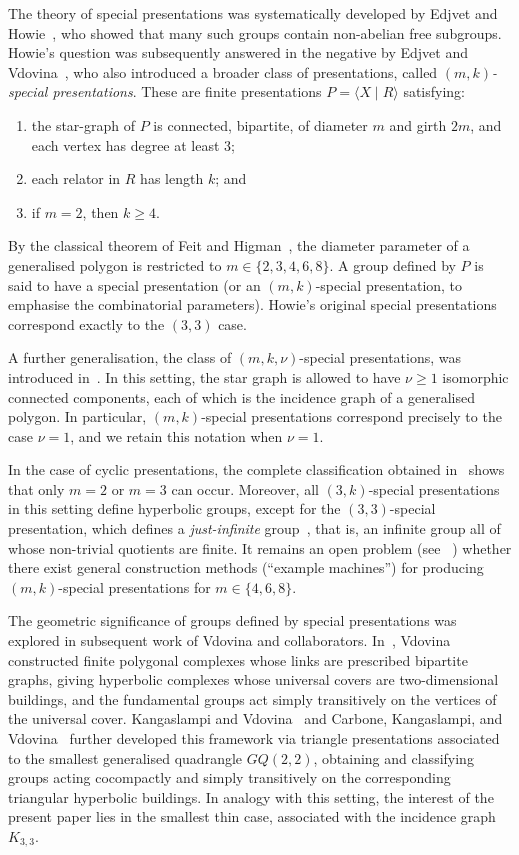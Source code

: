\documentclass[a4paper,12pt,oneside]{article}
\begin{document}
\medskip
The theory of special presentations was systematically developed by Edjvet and Howie~\cite{EH88}, who showed that many such groups contain non-abelian free subgroups. Howie’s question was subsequently answered in the negative by Edjvet and Vdovina~\cite{EV10}, who also introduced a broader class of presentations, called \emph{$(m,k)$-special presentations}. These are finite presentations $P=\langle X \mid R\rangle$ satisfying:
\begin{enumerate}
\item the star-graph of $P$ is connected, bipartite, of diameter $m$ and girth $2m$, and each vertex has degree at least $3$;
\item each relator in $R$ has length $k$; and
\item if $m=2$, then $k \ge 4$.
\end{enumerate}
By the classical theorem of Feit and Higman~\cite{FH64}, the diameter parameter of a generalised polygon is restricted to
\(
m\in\{2,3,4,6,8\}.
\)
A group defined by $P$ is said to have a special presentation (or an $(m,k)$-special presentation, to emphasise the combinatorial parameters). Howie’s original special presentations correspond exactly to the $(3,3)$ case. 

\medskip
A further generalisation, the class of $(m,k,\nu)$-special presentations, was introduced in~\cite{CW21, CW23}. In this setting, the star graph is allowed to have $\nu \geq 1$ isomorphic connected components, each of which is the incidence graph of a generalised polygon. In particular, $(m,k)$-special presentations correspond precisely to the case $\nu = 1$, and we retain this notation when $\nu = 1$.

\medskip
In the case of cyclic presentations, the complete classification obtained in~\cite{CW21} shows that only $m=2$ or $m=3$ can occur. Moreover, all $(3,k)$-special presentations in this setting define hyperbolic groups, except for the $(3,3)$-special presentation, which defines a \emph{just-infinite} group~\cite{EV10}, that is, an infinite group all of whose non-trivial quotients are finite. It remains an open problem (see ~\cite[Question 2]{EV10}) whether there exist general construction methods (``example machines'') for producing $(m,k)$-special presentations for $m \in \{4,6,8\}$.

\medskip
The geometric significance of groups defined by special presentations was explored in subsequent work of Vdovina and collaborators. In~\cite{Vdovina99,Vdovina03}, Vdovina constructed finite polygonal complexes whose links are prescribed bipartite graphs, giving hyperbolic complexes whose universal covers are two-dimensional buildings, and the fundamental groups act simply transitively on the vertices of the universal cover. Kangaslampi and Vdovina~\cite{KV} and Carbone, Kangaslampi, and Vdovina~\cite{CKV12} further developed this framework via triangle presentations associated to the smallest generalised quadrangle $GQ(2,2)$, obtaining and classifying groups acting cocompactly and simply transitively on the corresponding triangular hyperbolic buildings. In analogy with this setting, the interest of the present paper lies in the smallest thin case, associated with the incidence graph $K_{3,3}$.
\end{document}
